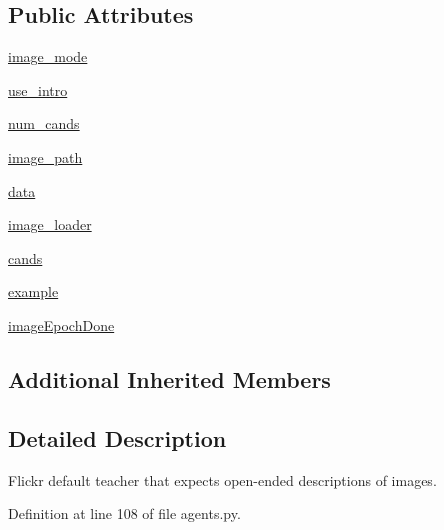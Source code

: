 \subsection*{Public Attributes}
\begin{DoxyCompactItemize}
\item 
\hyperlink{classparlai_1_1tasks_1_1flickr30k_1_1agents_1_1DefaultTeacher_a9172db25337a0e2c2c8348c0f2d63d69}{image\+\_\+mode}
\item 
\hyperlink{classparlai_1_1tasks_1_1flickr30k_1_1agents_1_1DefaultTeacher_a26c3c801b4cd7566cf554c6398e893ce}{use\+\_\+intro}
\item 
\hyperlink{classparlai_1_1tasks_1_1flickr30k_1_1agents_1_1DefaultTeacher_ab11d2ec093158073e7188bcc4170c56a}{num\+\_\+cands}
\item 
\hyperlink{classparlai_1_1tasks_1_1flickr30k_1_1agents_1_1DefaultTeacher_afbcd6505a2f71a7f55429ea316c2a7ea}{image\+\_\+path}
\item 
\hyperlink{classparlai_1_1tasks_1_1flickr30k_1_1agents_1_1DefaultTeacher_a91027d6545dc40fbd4ed09f34404d8e5}{data}
\item 
\hyperlink{classparlai_1_1tasks_1_1flickr30k_1_1agents_1_1DefaultTeacher_a10f2d48d9fabab085243366a708b8f9a}{image\+\_\+loader}
\item 
\hyperlink{classparlai_1_1tasks_1_1flickr30k_1_1agents_1_1DefaultTeacher_a2a1b276618cd9efb01b7b0f21ff338ec}{cands}
\item 
\hyperlink{classparlai_1_1tasks_1_1flickr30k_1_1agents_1_1DefaultTeacher_a541ebd56a221be4a71669e6ff799cf14}{example}
\item 
\hyperlink{classparlai_1_1tasks_1_1flickr30k_1_1agents_1_1DefaultTeacher_a5998c19d0306b5571d17aa38bbc22f73}{image\+Epoch\+Done}
\end{DoxyCompactItemize}
\subsection*{Additional Inherited Members}


\subsection{Detailed Description}
\begin{DoxyVerb}Flickr default teacher that expects open-ended descriptions of images.
\end{DoxyVerb}
 

Definition at line 108 of file agents.\+py.



